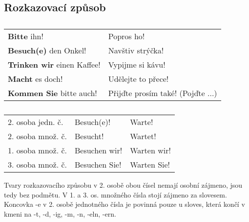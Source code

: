     \subsection*{Rozkazovací způsob}
      \begin{table}[ht!]   %
        \hspace*{1em}
        \begin{tabular}{ll}
          \hline
             \textbf{Bitte} ihn!                & Popros ho!                          \\
             \textbf{Besuch(e)} den Onkel!      & Navštiv strýčka!                    \\
             \textbf{Trinken wir} einen Kaffee! & Vypijme si kávu!                    \\
             \textbf{Macht} es doch!            & Udělejte to přece!                  \\
             \textbf{Kommen Sie} bitte auch!    & Přijďte prosím také! (Pojďte ...)    \\
          \hline
        \end{tabular}
        \caption*{ }
      \end{table}

      \begin{table}[ht!]
        \hspace*{1em}
        \begin{tabular}{lll}  %
          \hline
            2. osoba jedn. č. & Besuch(e)!    & Warte!         \\
            2. osoba množ. č. & Besucht!      & Wartet!        \\
            1. osoba množ. č. & Besuchen wir! & Warten wir!    \\
            3. osoba množ. č. & Besuchen Sie! & Warten Sie!    \\
          \hline
        \end{tabular}
        \caption*{}
      \end{table}
      Tvary rozkazovacího způsobu v 2. osobě obou čísel nemají osobní zájmeno, jsou tedy bez 
      podmětu. V 1. a 3. os. množného čísla stojí zájmeno za slovesem. Koncovka -e v 2. osobě 
      jednotného čísla je povinná pouze u sloves, která končí v kmeni na -t, -d, -ig, -m, -n, -eln, 
      -ern.
      

